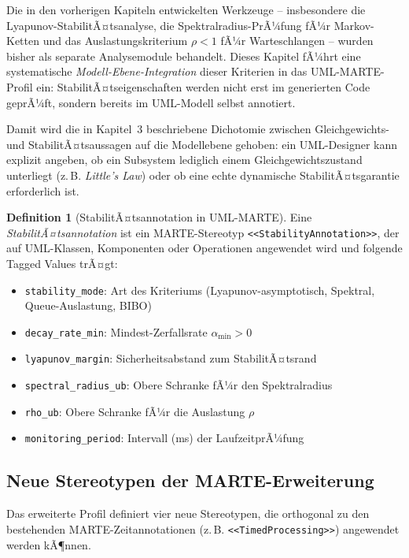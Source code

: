 ﻿\documentclass[a4paper,12pt]{report}
\theoremstyle{definition}
\newtheorem{definition}{Definition}[section]
\begin{document}
Die in den vorherigen Kapiteln entwickelten Werkzeuge -- insbesondere die
Lyapunov-StabilitÃ¤tsanalyse, die Spektralradius-PrÃ¼fung fÃ¼r Markov-Ketten
und das Auslastungskriterium $\rho < 1$ fÃ¼r Warteschlangen -- wurden bisher
als separate Analysemodule behandelt. Dieses Kapitel fÃ¼hrt eine systematische
\textit{Modell-Ebene-Integration} dieser Kriterien in das UML-MARTE-Profil
ein: StabilitÃ¤tseigenschaften werden nicht erst im generierten Code geprÃ¼ft,
sondern bereits im UML-Modell selbst annotiert.

Damit wird die in Kapitel~3 beschriebene Dichotomie zwischen Gleichgewichts-
und StabilitÃ¤tsaussagen auf die Modellebene gehoben: ein UML-Designer kann
explizit angeben, ob ein Subsystem lediglich einem Gleichgewichtszustand
unterliegt (z.\,B. \textit{Little's Law}) oder ob eine echte dynamische
StabilitÃ¤tsgarantie erforderlich ist.

\begin{definition}[StabilitÃ¤tsannotation in UML-MARTE]
	Eine \emph{StabilitÃ¤tsannotation} ist ein MARTE-Stereotyp
	\texttt{<<StabilityAnnotation>>}, der auf UML-Klassen, Komponenten oder
	Operationen angewendet wird und folgende Tagged Values trÃ¤gt:
	\begin{itemize}
		\item[-] \texttt{stability\_mode}: Art des Kriteriums
		(Lyapunov-asymptotisch, Spektral, Queue-Auslastung, BIBO)
		\item[-] \texttt{decay\_rate\_min}: Mindest-Zerfallsrate
		$\alpha_{\min} > 0$
		\item[-] \texttt{lyapunov\_margin}: Sicherheitsabstand zum
		StabilitÃ¤tsrand
		\item[-] \texttt{spectral\_radius\_ub}: Obere Schranke fÃ¼r den
		Spektralradius
		\item[-] \texttt{rho\_ub}: Obere Schranke fÃ¼r die Auslastung $\rho$
		\item[-] \texttt{monitoring\_period}: Intervall (ms) der
		LaufzeitprÃ¼fung
	\end{itemize}
\end{definition}

\subsection{Neue Stereotypen der MARTE-Erweiterung}

Das erweiterte Profil definiert vier neue Stereotypen, die orthogonal zu
den bestehenden MARTE-Zeitannotationen (z.\,B.
\texttt{<<TimedProcessing>>}) angewendet werden kÃ¶nnen.
\end{document}
